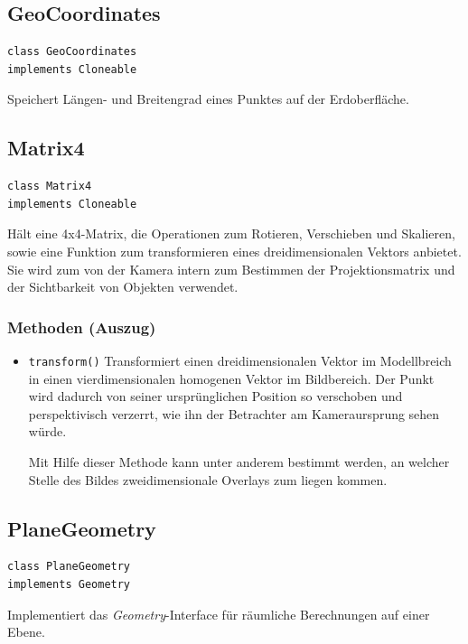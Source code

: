 \documentclass[10pt]{scrreprt}
\begin{document}
\vspace{2mm}
\subsection*{GeoCoordinates}
\begin{lstlisting}
class GeoCoordinates
implements Cloneable
\end{lstlisting}
Speichert Längen- und Breitengrad eines Punktes auf der Erdoberfläche.

\pagebreak

\subsection*{Matrix4}
\begin{lstlisting}
class Matrix4
implements Cloneable
\end{lstlisting}
Hält eine 4x4-Matrix, die Operationen zum Rotieren, Verschieben und Skalieren, sowie eine Funktion zum transformieren eines dreidimensionalen Vektors anbietet. Sie wird zum von der Kamera intern zum Bestimmen der Projektionsmatrix und der Sichtbarkeit von Objekten verwendet.\\
\subsubsection*{Methoden (Auszug)}
\begin{itemize}
\item \texttt{transform()} Transformiert einen dreidimensionalen Vektor im Modellbreich in einen vierdimensionalen homogenen Vektor im Bildbereich. Der Punkt wird dadurch von seiner ursprünglichen Position so verschoben und perspektivisch verzerrt, wie ihn der Betrachter am Kameraursprung sehen würde.

Mit Hilfe dieser Methode kann unter anderem bestimmt werden, an welcher Stelle des Bildes zweidimensionale Overlays zum liegen kommen.
\end{itemize}

\vspace{5mm}
\subsection*{PlaneGeometry}
\begin{lstlisting}
class PlaneGeometry
implements Geometry
\end{lstlisting}
Implementiert das \textit{Geometry}-Interface für räumliche Berechnungen auf einer Ebene.\\
\end{document}
